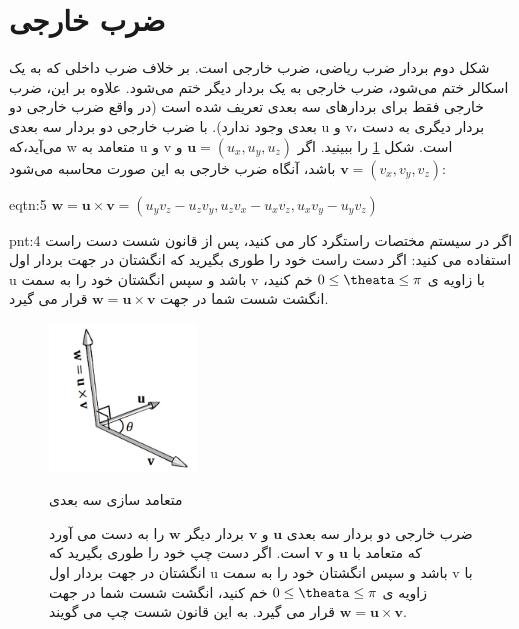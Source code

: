 \section{\textbf{ضرب خارجی}}
{
    \Large
    \begin{spacing}{1.5}
        شکل دوم بردار ضرب ریاضی، ضرب خارجی است.
        بر خلاف ضرب داخلی که به یک اسکالر ختم می‌شود، ضرب خارجی به یک بردار دیگر ختم می‌شود.
        علاوه بر این، ضرب خارجی فقط برای بردارهای سه بعدی تعریف شده است (در واقع ضرب خارجی دو بعدی وجود ندارد).
        با ضرب خارجی دو بردار سه بعدی u و v، بردار دیگری به دست می‌آید،که w متعامد به u و v است.
        شکل \ref{fig:4.Session.1.1.13} را ببینید.
        اگر $\textbf{u}=(u_{x},u_{y},u_{z})$ و  $\textbf{v}=(v_{x},v_{y},v_{z})$ باشد، آنگاه ضرب خارجی به این صورت محاسبه می‌شود:

        \begin{eqtn}{eqtn:5}
            \centering
            $\textbf{w}=\textbf{u}\times\textbf{v}=(u_{y}v_{z}-u_{z}v_{y}, u_{z}v_{x}-u_{x}v_{z}, u_{x}v_{y}-u_{y}v_{z})$
        \end{eqtn}

        \begin{point}{pnt:4}
            \Large
            اگر در سیستم مختصات راستگرد کار می کنید، پس از قانون شست دست راست استفاده می کنید:
            اگر دست راست خود را طوری بگیرید که انگشتان در جهت بردار اول u باشد و سپس انگشتان خود را به سمت v با زاویه ی $0\leq\theata\leq \pi$ خم کنید، انگشت شست شما در جهت $\textbf{w}=\textbf{u}\times\textbf{v}$ قرار می گیرد.
        \end{point}

        \begin{figure}[H]
            \centering
            \setlength{\belowcaptionskip}{-10pt}
            \includegraphics[width=0.35\textwidth]{Images/4/4.Session.1.1.13}
            \caption{ضرب خارجی دو بردار سه بعدی $\textbf{u}$ و $\textbf{v}$ بردار دیگر $\textbf{w}$ را به دست می آورد که متعامد با $\textbf{u}$ و $\textbf{v}$ است.
            اگر دست چپ خود را طوری بگیرید که انگشتان در جهت بردار اول u باشد و سپس انگشتان خود را به سمت v با زاویه ی $0\leq\theata\leq \pi$ خم کنید، انگشت شست شما در جهت $\textbf{w}=\textbf{u}\times\textbf{v}$ قرار می گیرد. به این قانون شست چپ می گویند.}
            {متعامد سازی سه بعدی}
            \label{fig:4.Session.1.1.13}
        \end{figure}


\end{spacing}}
